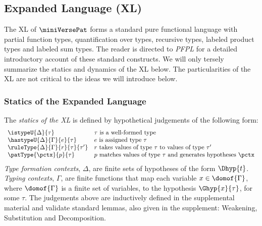 \documentclass[acmlarge,review,anonymous]{acmart}\settopmatter{printfolios=true}
\begin{document}
\subsection{Expanded Language (XL)}
The {XL} of $\miniVersePat$ forms a standard pure functional language with partial function types, quantification over types, recursive types, labeled product types and labeled sum types. 
 The reader is directed to \emph{PFPL} \cite{pfple1} for a detailed introductory account of these standard constructs. We will only tersely summarize the statics and dynamics of the XL below. The particularities of the XL are not critical to the ideas we will introduce below.

\subsubsection{Statics of the Expanded Language}
The \emph{statics of the XL} is defined by hypothetical judgements of the following form:
\[\begin{array}{ll}
\istypeU{\Delta}{\tau} & \text{$\tau$ is a well-formed type}\\
\hastypeU{\Delta}{\Gamma}{e}{\tau} & \text{$e$ is assigned type $\tau$}\\
\ruleType{\Delta}{\Gamma}{r}{\tau}{\tau'} & \text{$r$ takes values of type $\tau$ to values of type $\tau'$}\\
\patType{\pctx}{p}{\tau} & \text{$p$ matches values of type $\tau$ and generates hypotheses $\pctx$} 
\end{array}\]
\emph{Type formation contexts}, $\Delta$, are finite sets of hypotheses of the form $\Dhyp{t}$. %
\emph{Typing contexts}, $\Gamma$, are finite functions that map each variable $x \in \domof{\Gamma}$, where $\domof{\Gamma}$ is a finite set of variables, to the hypothesis $\Ghyp{x}{\tau}$, for some $\tau$. The judgements above are inductively defined in the supplemental material and validate standard lemmas, also given in the supplement: Weakening, Substitution and Decomposition.
\end{document}
